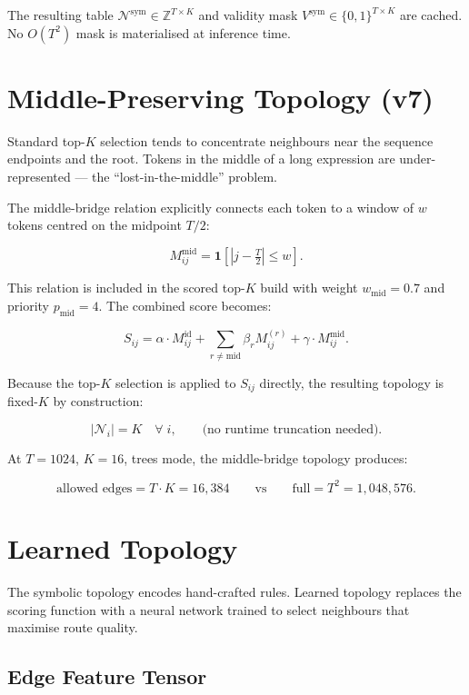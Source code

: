 \documentclass[11pt]{article}
\begin{document}
The resulting table $\mathcal{N}^{\text{sym}} \in \mathbb{Z}^{T\times K}$
and validity mask $V^{\text{sym}} \in \{0,1\}^{T\times K}$
are cached.  No $O(T^2)$ mask is materialised at inference time.

\section*{Middle-Preserving Topology (v7)}

Standard top-$K$ selection tends to concentrate neighbours near
the sequence endpoints and the root.  Tokens in the middle of a long
expression are under-represented — the ``lost-in-the-middle'' problem.

The middle-bridge relation explicitly connects each token to a window
of $w$ tokens centred on the midpoint $T/2$:

\[
M^{\text{mid}}_{ij}
=
\mathbf{1}\!\left[\left|j - \tfrac{T}{2}\right| \leq w\right].
\]

This relation is included in the scored top-$K$ build with
weight $w_{\text{mid}} = 0.7$ and priority $p_{\text{mid}} = 4$.
The combined score becomes:

\[
S_{ij}
= \alpha \cdot M^{\text{id}}_{ij}
+ \sum_{r \neq \text{mid}} \beta_r M^{(r)}_{ij}
+ \gamma \cdot M^{\text{mid}}_{ij}.
\]

Because the top-$K$ selection is applied to $S_{ij}$ directly,
the resulting topology is fixed-$K$ by construction:

\[
|\mathcal{N}_i| = K \quad \forall\; i,
\qquad \text{(no runtime truncation needed)}.
\]

At $T=1024$, $K=16$, trees mode, the middle-bridge topology produces:

\[
\text{allowed edges} = T \cdot K = 16{,}384
\qquad\text{vs}\qquad
\text{full} = T^2 = 1{,}048{,}576.
\]

\section*{Learned Topology}

The symbolic topology encodes hand-crafted rules.
Learned topology replaces the scoring function with a neural network
trained to select neighbours that maximise route quality.

\subsection*{Edge Feature Tensor}
\end{document}
